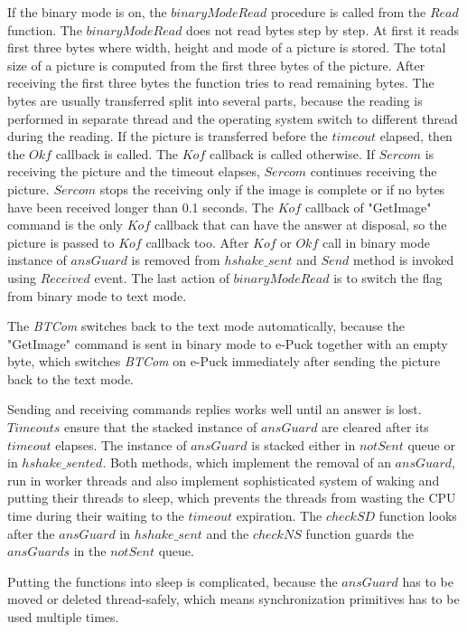 \documentclass[12pt,notitlepage]{report}
\begin{document}
	If the binary mode is on, the $binaryModeRead$ procedure is called from
	the $Read$ function. The $binaryModeRead$ does not read bytes step by step.
	At first it reads first three bytes where width, height and mode of a picture is stored.
	The total size of a picture is computed from the first three bytes of the picture.
	After receiving the first three bytes the function tries to read remaining bytes.
	The bytes are usually transferred split into several parts,
	because the reading is performed in separate thread and 
	the operating system switch to different thread during the reading.
	If the picture is transferred before the $timeout$ elapsed, then the $Okf$ callback is called.
	The $Kof$ callback is called otherwise. 
	If $Sercom$ is receiving the picture and the timeout elapses,
	$Sercom$ continues receiving the picture. $Sercom$ stops the receiving only if
	the image is complete or if no bytes have been received longer than 0.1 seconds.
	The $Kof$ callback of "GetImage" command is the only $Kof$ callback 
	that can have the answer at disposal, so the picture is passed to $Kof$ callback too.	
	After $Kof$ or $Okf$ call in binary mode instance of $ansGuard$ is removed from $hshake\_sent$ 
	and $Send$ method is invoked using $Received$ event.
	The last action of $binaryModeRead$ is to switch the flag from binary mode to text mode.
	
	The {\it BTCom} switches back to the text mode automatically, because
	the "GetImage" command is sent in binary mode to e-Puck together with an empty byte, which
	switches {\it BTCom} on e-Puck  immediately after sending the picture back to the text mode.

	Sending and receiving commands replies works well 
	until an answer is lost. $Timeouts$ ensure that the stacked instance of $ansGuard$ are cleared after its $timeout$  elapses.
	The instance of $ansGuard$ is stacked either in $notSent$ queue	or in $hshake\_sented$.
	Both methods, which implement the removal of an $ansGuard$, run in worker threads and also implement
	sophisticated system of waking and putting their threads to sleep, which prevents the threads from wasting
	the CPU time during their waiting to the $timeout$ expiration. 
	The $checkSD$ function looks after the $ansGuard$ in $hshake\_sent$ and the $checkNS$ function guards
	the $ansGuards$ in the $notSent$ queue.

	Putting the functions into sleep is complicated, because the $ansGuard$ has to be moved or deleted thread-safely,
	which means synchronization primitives has to be used multiple times.
	
\end{document}
